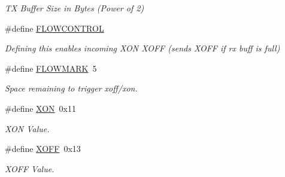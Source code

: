 \begin{DoxyCompactItemize}
\begin{DoxyCompactList}\small\item\em T\-X Buffer Size in Bytes (Power of 2) \end{DoxyCompactList}\item 
\#define \hyperlink{group__uart_gaff1f07741fbe1f53f46098687f0a05e2}{F\-L\-O\-W\-C\-O\-N\-T\-R\-O\-L}
\begin{DoxyCompactList}\small\item\em Defining this enables incoming X\-O\-N X\-O\-F\-F (sends X\-O\-F\-F if rx buff is full) \end{DoxyCompactList}\item 
\#define \hyperlink{group__uart_gaa7907a070ef8e6d68d7d774b34eebe66}{F\-L\-O\-W\-M\-A\-R\-K}~5
\begin{DoxyCompactList}\small\item\em Space remaining to trigger xoff/xon. \end{DoxyCompactList}\item 
\#define \hyperlink{group__uart_gacdf721774c51e08c6609e6fa8cf82cc9}{X\-O\-N}~0x11
\begin{DoxyCompactList}\small\item\em X\-O\-N Value. \end{DoxyCompactList}\item 
\#define \hyperlink{group__uart_ga67fd78ae15d2b67c10d44d69a49ab1c5}{X\-O\-F\-F}~0x13
\begin{DoxyCompactList}\small\item\em X\-O\-F\-F Value. \end{DoxyCompactList}\end{DoxyCompactItemize}
